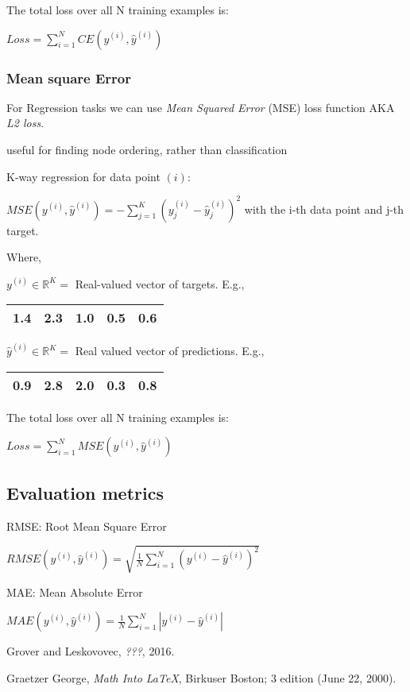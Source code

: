 \documentclass{article}
\begin{document}
The total loss over all N training examples is:

$Loss = \sum_{i=1}^N CE(y^{(i)}, \hat{y}^{(i)})$


\subsubsection{Mean square Error}

For Regression tasks we can use \emph{Mean Squared Error} (MSE) loss function AKA \emph{L2 loss}.

useful for finding node ordering, rather than classification

K-way regression for data point $(i)$:

$\mathit{MSE}(y^{(i)}, \hat{y}^{(i)}) = -\sum_{j=1}^K (y_j^{(i)} - \hat{y}_j^{(i)})^2$ with the i-th data point and j-th target.

Where,

$y^{(i)} \in \mathbb{R}^K =$ Real-valued vector of targets. E.g.,

\begin{tabular}{|c|c|c|c|c|}
    \hline
    1.4 & 2.3 & 1.0 & 0.5 & 0.6 \\
    \hline    
\end{tabular}

$\hat{y}^{(i)} \in \mathbb{R}^K =$ Real valued vector of predictions. E.g.,

\begin{tabular}{|c|c|c|c|c|}
    \hline
    0.9 & 2.8 & 2.0 & 0.3 & 0.8 \\
    \hline    
\end{tabular}

The total loss over all N training examples is:

$Loss = \sum_{i=1}^N MSE(y^{(i)}, \hat{y}^{(i)})$ 


\subsection{Evaluation metrics}

RMSE: Root Mean Square Error

$RMSE(y^{(i)}, \hat{y}^{(i)}) = \sqrt{\frac{1}{N} \sum_{i=1}^N (y^{(i)} - \hat{y}^{(i)})^2}$

MAE: Mean Absolute Error

$MAE(y^{(i)}, \hat{y}^{(i)}) = \frac{1}{N} \sum_{i=1}^N |y^{(i)} - \hat{y}^{(i)}|$


\clearpage


\begin{thebibliography}{10}

   Grover and Leskovovec, 
  \emph{???}, 2016.
  
   Graetzer George, \emph{Math Into \LaTeX},
  Birkuser Boston; 3 edition (June 22, 2000).
  
\end{thebibliography}
  
\end{document}
